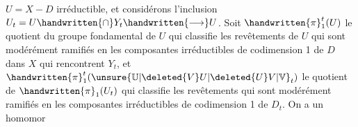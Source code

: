  $U=X-D$ irréductible, et considérons l'inclusion $U_t=U\handwritten{\cap}Y_t\handwritten{\longrightarrow}U$.  Soit $\handwritten{\pi}_1^t(U)$ le  quotient du groupe fondamental de $U$  qui classifie les revêtements de $U$ qui sont modérément ramifiés en les composantes irréductibles de codimension 1 de $D$ dans $X$ qui rencontrent $Y_t$,  et $\handwritten{\pi}_1^t(\unsure{\mathbb{U}|\deleted{V}U|\deleted{U}V|\mathbb{V}}_t)$ le quotient  de $\handwritten{\pi}_1(U_t)$ qui classifie les revêtements qui sont modérément ramifiés en les composantes irréductibles de codimension 1 de $D_t$. On a un homomor%
